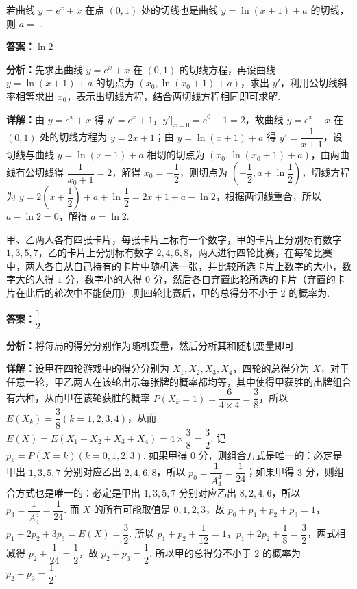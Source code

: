 \begin{question}[points=5]
若曲线 $y=e^x+x$ 在点 $(0,1)$ 处的切线也是曲线 $y=\ln(x+1)+a$ 的切线，则 $a=$ .
\fillin[{$\ln 2$}]
\begin{solution}
\textbf{答案：}$\ln 2$

\textbf{分析：}先求出曲线 $y=e^x+x$ 在 $(0,1)$ 的切线方程，再设曲线 $y=\ln(x+1)+a$ 的切点为 $(x_0,\ln(x_0+1)+a)$，求出 $y'$，利用公切线斜率相等求出 $x_0$，表示出切线方程，结合两切线方程相同即可求解.

\textbf{详解：}由 $y=e^x+x$ 得 $y'=e^x+1$，$y'|_{x=0}=e^0+1=2$，故曲线 $y=e^x+x$ 在 $(0,1)$ 处的切线方程为 $y=2x+1$；由 $y=\ln(x+1)+a$ 得 $y'=\dfrac{1}{x+1}$，设切线与曲线 $y=\ln(x+1)+a$ 相切的切点为 $(x_0,\ln(x_0+1)+a)$，由两曲线有公切线得 $\dfrac{1}{x_0+1}=2$，解得 $x_0=-\dfrac{1}{2}$，则切点为 $\left(-\dfrac{1}{2},a+\ln\dfrac{1}{2}\right)$，切线方程为 $y=2\left(x+\dfrac{1}{2}\right)+a+\ln\dfrac{1}{2}=2x+1+a-\ln 2$，根据两切线重合，所以 $a-\ln 2=0$，解得 $a=\ln 2$.
\end{solution}
\end{question}

\begin{question}[points=5]
甲、乙两人各有四张卡片，每张卡片上标有一个数字，甲的卡片上分别标有数字 $1,3,5,7$，乙的卡片上分别标有数字 $2,4,6,8$，两人进行四轮比赛，在每轮比赛中，两人各自从自己持有的卡片中随机选一张，并比较所选卡片上数字的大小，数字大的人得 $1$ 分，数字小的人得 $0$ 分，然后各自弃置此轮所选的卡片（弃置的卡片在此后的轮次中不能使用）.则四轮比赛后，甲的总得分不小于 $2$ 的概率为.
\fillin[{$\dfrac{1}{2}$}]
\begin{solution}
\textbf{答案：}$\dfrac{1}{2}$

\textbf{分析：}将每局的得分分别作为随机变量，然后分析其和随机变量即可.

\textbf{详解：}设甲在四轮游戏中的得分分别为 $X_1,X_2,X_3,X_4$，四轮的总得分为 $X$，对于任意一轮，甲乙两人在该轮出示每张牌的概率都均等，其中使得甲获胜的出牌组合有六种，从而甲在该轮获胜的概率 $P(X_k=1)=\dfrac{6}{4\times4}=\dfrac{3}{8}$，所以 $E(X_k)=\dfrac{3}{8}(k=1,2,3,4)$，从而 $E(X)=E(X_1+X_2+X_3+X_4)=4\times\dfrac{3}{8}=\dfrac{3}{2}$. 记 $p_k=P(X=k)(k=0,1,2,3)$. 如果甲得 $0$ 分，则组合方式是唯一的：必定是甲出 $1,3,5,7$ 分别对应乙出 $2,4,6,8$，所以 $p_0=\dfrac{1}{A_4^4}=\dfrac{1}{24}$；如果甲得 $3$ 分，则组合方式也是唯一的：必定是甲出 $1,3,5,7$ 分别对应乙出 $8,2,4,6$，所以 $p_3=\dfrac{1}{A_4^4}=\dfrac{1}{24}$. 而 $X$ 的所有可能取值是 $0,1,2,3$，故 $p_0+p_1+p_2+p_3=1$，$p_1+2p_2+3p_3=E(X)=\dfrac{3}{2}$. 所以 $p_1+p_2+\dfrac{1}{12}=1$，$p_1+2p_2+\dfrac{1}{8}=\dfrac{3}{2}$，两式相减得 $p_2+\dfrac{1}{24}=\dfrac{1}{2}$，故 $p_2+p_3=\dfrac{1}{2}$. 所以甲的总得分不小于 $2$ 的概率为 $p_2+p_3=\dfrac{1}{2}$.
\end{solution}
\end{question}

